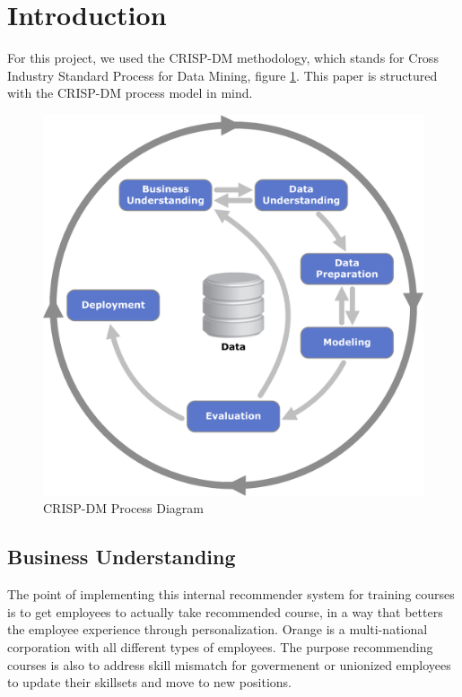 \documentclass[12pt,journal]{IEEEtran}
\begin{document}
\IEEEpeerreviewmaketitle



\section{Introduction}

For this project, we used the CRISP-DM methodology, which stands for Cross Industry Standard Process for Data Mining, figure \ref{fig:crisp-dm}. This paper is structured with the CRISP-DM process model in mind.

\begin{figure}[htbp]
\begin{center}
\includegraphics[width=1\columnwidth]{CRISP-DM_Process_Diagram}
\end{center}
\caption{CRISP-DM Process Diagram}
\label{fig:crisp-dm}
\end{figure}

\subsection{Business Understanding}

The point of implementing this internal recommender system for training courses is to get employees to actually take recommended course, in a way that betters the employee experience through personalization.  Orange is a multi-national corporation with all different types of employees.  The purpose recommending courses is also to address skill mismatch for govermenent or unionized employees to update their skillsets and move to new positions.
\end{document}
